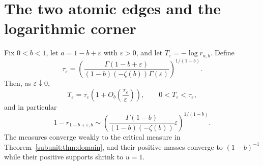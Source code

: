 \section{The two atomic edges and the logarithmic corner}

\begin{theorem}
\label{subunit:thm:boundarylayer}
Fix $0<b<1$, let $a=1-b+\varepsilon$ with $\varepsilon>0$, and
let $T_\varepsilon=-\log r_{a,b}$. Define
\[
 \tau_\varepsilon=
 \left(\frac{\Gamma(1-b+\varepsilon)}
 {(1-b)(-\zeta(b))\Gamma(\varepsilon)}\right)^{1/(1-b)}.
\]
Then, as $\varepsilon\downarrow0$,
\begin{equation}\label{subunit:eq:layerexact}
 T_\varepsilon=\tau_\varepsilon
 \left(1+O_b\left(\frac{\tau_\varepsilon}{\varepsilon}\right)\right),
 \qquad 0<T_\varepsilon<\tau_\varepsilon,
\end{equation}
and in particular
\begin{equation}\label{subunit:eq:layerleading}
 1-r_{1-b+\varepsilon,b}\sim
 \left(\frac{\Gamma(1-b)}{(1-b)(-\zeta(b))}
       \varepsilon\right)^{1/(1-b)}.
\end{equation}
The measures converge weakly to the critical measure in
Theorem~\ref{subunit:thm:domain}, and their positive masses converge
to $(1-b)^{-1}$ while their positive supports shrink to $u=1$.
\end{theorem}

